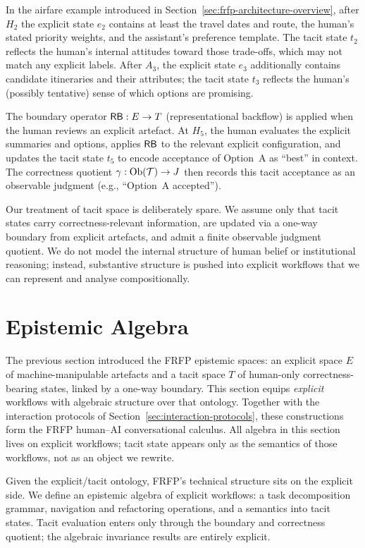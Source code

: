 In the airfare example introduced in Section~\ref{sec:frfp-architecture-overview}, after \(H_2\) the explicit state \(e_2\) contains at least the travel dates and route, the human's stated priority weights, and the assistant's preference template. The tacit state \(t_2\) reflects the human's internal attitudes toward those trade-offs, which may not match any explicit labels. After \(A_3\), the explicit state \(e_3\) additionally contains candidate itineraries and their attributes; the tacit state \(t_3\) reflects the human's (possibly tentative) sense of which options are promising.

The boundary operator \(\mathsf{RB}:E\to T\) (representational backflow) is applied when the human reviews an explicit artefact. At \(H_5\), the human evaluates the explicit summaries and options, applies \(\mathsf{RB}\) to the relevant explicit configuration, and updates the tacit state \(t_5\) to encode acceptance of Option~A as ``best'' in context. The correctness quotient \(\gamma:\mathrm{Ob}(\mathcal{T})\to J\) then records this tacit acceptance as an observable judgment (e.g., ``Option~A accepted'').

Our treatment of tacit space is deliberately spare. We assume only that tacit states carry correctness-relevant information, are updated via a one-way boundary from explicit artefacts, and admit a finite observable judgment quotient. We do not model the internal structure of human belief or institutional reasoning; instead, substantive structure is pushed into explicit workflows that we can represent and analyse compositionally.
\section{Epistemic Algebra}
\label{sec:epistemicalgebra}
The previous section introduced the FRFP epistemic spaces: an explicit space $E$ of machine-manipulable artefacts and a tacit space $T$ of human-only correctness-bearing states, linked by a one-way boundary. This section equips \emph{explicit} workflows with algebraic structure over that ontology. Together with the interaction protocols of Section~\ref{sec:interaction-protocols}, these constructions form the FRFP human--AI conversational calculus. All algebra in this section lives on explicit workflows; tacit state appears only as the semantics of those workflows, not as an object we rewrite.

Given the explicit/tacit ontology, FRFP’s technical structure sits on the explicit side. We define an epistemic algebra of explicit workflows: a task decomposition grammar, navigation and refactoring operations, and a semantics into tacit states. Tacit evaluation enters only through the boundary and correctness quotient; the algebraic invariance results are entirely explicit.


